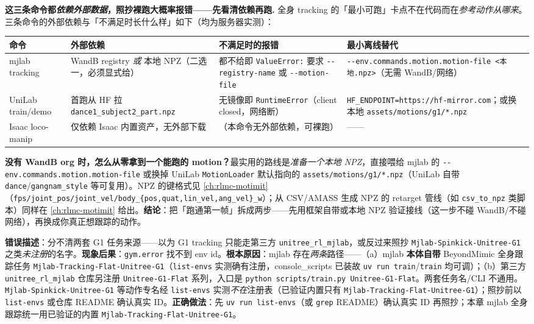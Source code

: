 \begin{note}
\textbf{这三条命令都\emph{依赖外部数据}，照抄裸跑大概率报错——先看清依赖再跑.}\;
全身 tracking 的「最小可跑」卡点不在代码而在\emph{参考动作从哪来}。三条命令的外部依赖与「不满足时长什么样」如下（均为服务器实测）：

\begin{center}
\small
\begin{tabular}{p{2.6cm}p{3.2cm}p{3.0cm}p{2.9cm}}
\hline
命令 & 外部依赖 & 不满足时的报错 & 最小离线替代 \\
\hline
mjlab tracking & WandB registry \emph{或} 本地 NPZ（二选一，必须显式给） & 都不给即 \verb|ValueError:| 要求 \verb|--registry-name| 或 \verb|--motion-file| & \verb|--env.commands.motion.motion-file <本地.npz>|（无需 WandB/网络） \\
UniLab train/demo & 首跑从 HF 拉 \verb|dance1_subject2_part.npz| & 无镜像即 \verb|RuntimeError|（client closed，网络断） & \verb|HF_ENDPOINT=https://hf-mirror.com|；或换本地 \verb|assets/motions/g1/*.npz| \\
Isaac loco-manip & 仅依赖 Isaac 内置资产，无外部下载 & （本命令无外部依赖，可裸跑） & —— \\
\hline
\end{tabular}
\end{center}

\textbf{没有 WandB org 时，怎么从零拿到一个能跑的 motion？}\;最实用的路线是\emph{准备一个本地 NPZ}，直接喂给 mjlab 的 \verb|--env.commands.motion.motion-file| 或换掉 UniLab \verb|MotionLoader| 默认指向的 \verb|assets/motions/g1/*.npz|（UniLab 自带 \verb|dance|/\verb|gangnam_style| 等可复用）。NPZ 的键格式见 \cref{ch:rlmc-motimit}（\verb|fps/joint_pos/joint_vel/body_{pos,quat,lin_vel,ang_vel}_w|）；从 CSV/AMASS 生成 NPZ 的 retarget 管线（如 \verb|csv_to_npz| 类脚本）同样在 \cref{ch:rlmc-motimit} 给出。\textbf{结论}：把「跑通第一帧」拆成两步——先用框架自带或本地 NPZ 验证接线（这一步不碰 WandB/不碰网络），再换成你真正想跟踪的动作。
\end{note}

\begin{pitfall}
\textbf{错误描述}：分不清两套 G1 任务来源——以为 G1 tracking 只能走第三方 \texttt{unitree\_rl\_mjlab}，或反过来照抄 \texttt{Mjlab-Spinkick-Unitree-G1} 之类\emph{未注册}的名字。\textbf{现象后果}：\verb|gym.error| 找不到 env id。\textbf{根本原因}：mjlab 存在\emph{两条}路径——（a）mjlab \textbf{本体自带} BeyondMimic 全身跟踪任务 \texttt{Mjlab-Tracking-Flat-Unitree-G1}（\texttt{list-envs} 实测确有注册，console\_scripts 已装故 \texttt{uv run train}/\texttt{train} 均可调）；（b）第三方 \texttt{unitree\_rl\_mjlab} 仓库另注册 \texttt{Unitree-G1-Flat} 系列，入口是 \texttt{python scripts/train.py Unitree-G1-Flat}。两套任务名/CLI 不通用。\texttt{Mjlab-Spinkick-Unitree-G1} 等动作专名经 \texttt{list-envs} 实测\emph{不在}注册表（已验证内置只有 \texttt{Mjlab-Tracking-Flat-Unitree-G1}）；照抄前以 \texttt{list-envs} 或仓库 README 确认真实 ID。\textbf{正确做法}：先 \texttt{uv run list-envs}（或 \texttt{grep} README）确认真实 ID 再照抄；本章 mjlab 全身跟踪统一用已验证的内置 \texttt{Mjlab-Tracking-Flat-Unitree-G1}。
\end{pitfall}

